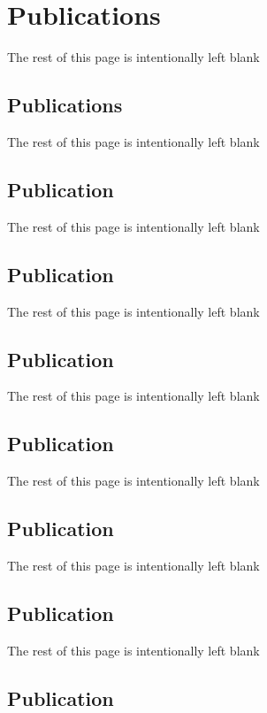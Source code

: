 \documentclass{article}
\def\lb{\vfill{The rest of this page is intentionally left blank}\vfill}
\begin{document}






% 
% 



\center \section{Publications}
\lb

\newpage
\center \subsection{Publications} 
 \lb 

\center \subsection{Publication} 
 \lb 

\center \subsection{Publication} 
 \lb 

\center \subsection{Publication} 
 \lb 

\center \subsection{Publication} 
 \lb 

\center \subsection{Publication} 
 \lb 

\center \subsection{Publication} 
 \lb 

\center \subsection{Publication} 
\end{document}
